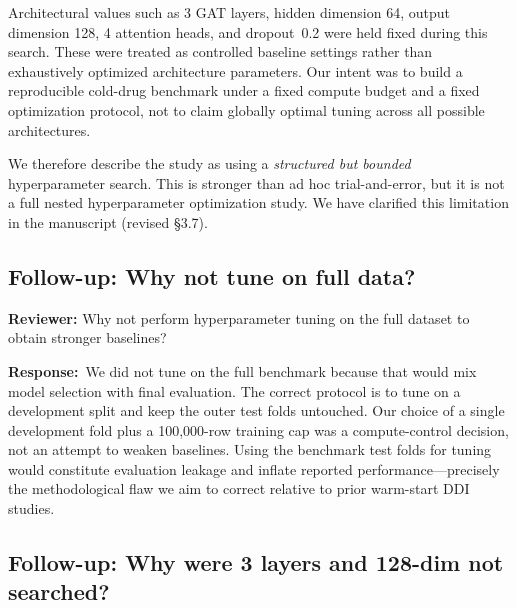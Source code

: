 \documentclass[11pt,a4paper]{article}
\newcommand{\reviewer}[1]{\textbf{\textcolor{reviewerbar}{Reviewer:}} #1}
\newcommand{\authorlabel}{\textbf{\textcolor{authorbar}{Response:}}}
\begin{document}
\begin{authorbox}
Architectural values such as 3 GAT layers, hidden dimension 64, output dimension 128,
4 attention heads, and dropout~0.2 were held fixed during this search.
These were treated as controlled baseline settings rather than exhaustively
optimized architecture parameters.
Our intent was to build a reproducible cold-drug benchmark under a fixed compute
budget and a fixed optimization protocol, not to claim globally optimal tuning
across all possible architectures.

We therefore describe the study as using a \emph{structured but bounded}
hyperparameter search.
This is stronger than ad hoc trial-and-error, but it is not a full nested
hyperparameter optimization study.
We have clarified this limitation in the manuscript (revised \S3.7).
\end{authorbox}

\subsection{Follow-up: Why not tune on full data?}

\begin{reviewerbox}
\reviewer{Why not perform hyperparameter tuning on the full dataset to obtain
stronger baselines?}
\end{reviewerbox}

\begin{authorbox}
\authorlabel\
We did not tune on the full benchmark because that would mix model selection
with final evaluation.
The correct protocol is to tune on a development split and keep the outer test
folds untouched.
Our choice of a single development fold plus a 100{,}000-row training cap was a
compute-control decision, not an attempt to weaken baselines.
Using the benchmark test folds for tuning would constitute evaluation leakage and
inflate reported performance---precisely the methodological flaw we aim to
correct relative to prior warm-start DDI studies.
\end{authorbox}

\subsection{Follow-up: Why were 3 layers and 128-dim not searched?}
\end{document}
